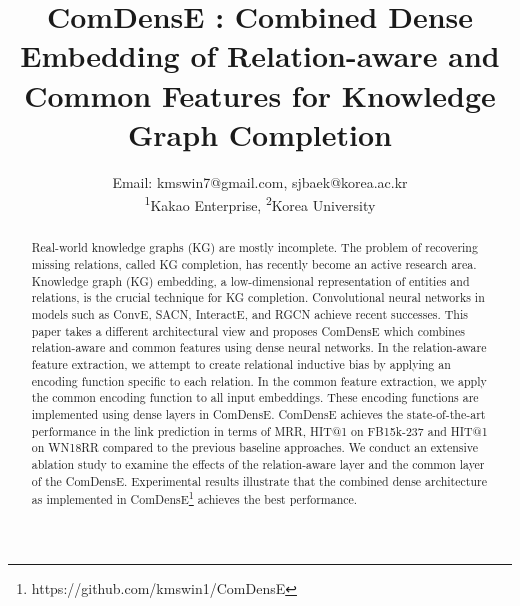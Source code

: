 \documentclass[a4paper,conference]{IEEEtran}
\begin{document}
\title{ComDensE : Combined Dense Embedding of Relation-aware and Common Features for Knowledge Graph Completion}


\author{
Email: kmswin7@gmail.com, sjbaek@korea.ac.kr\\
\textsuperscript{\rm 1}Kakao Enterprise, \textsuperscript{\rm 2}Korea University
}

\maketitle

\begin{abstract}
Real-world knowledge graphs (KG) are mostly incomplete. The problem of recovering missing relations, called KG completion, has recently become an active research area. Knowledge graph (KG) embedding, a low-dimensional representation of entities and relations, is the crucial technique for KG completion. Convolutional neural networks in models such as ConvE, SACN, InteractE, and RGCN achieve recent successes. This paper takes a different architectural view and proposes ComDensE which combines relation-aware and common features using dense neural networks. In the relation-aware feature extraction, we attempt to create relational inductive bias by applying an encoding function specific to each relation. In the common feature extraction, we apply the common encoding function to all input embeddings. These encoding functions are implemented using dense layers in ComDensE. ComDensE achieves the state-of-the-art performance in the link prediction in terms of MRR, HIT@1 on FB15k-237 and HIT@1 on WN18RR compared to the previous baseline approaches. We conduct an extensive ablation study to examine the effects of the relation-aware layer and the common layer of the ComDensE. Experimental results illustrate that the combined dense architecture as implemented in ComDensE\footnote{ https://github.com/kmswin1/ComDensE} achieves the best performance.
\end{abstract}
\IEEEpeerreviewmaketitle


















\end{document}
